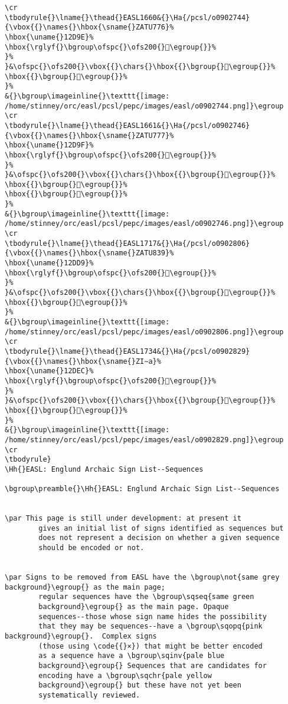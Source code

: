 \begin{verbatim}
\cr
\tbodyrule{}\lname{}\thead{}EASL1660&{}\Ha{/pcsl/o0902744}{\vbox{{}\names{}\hbox{\sname{}ZATU776}%
\hbox{\uname{}12D9E}%
\hbox{\rglyf{}\bgroup\ofspc{}\ofs200{}𒶞\egroup{}}%
}%
}&\ofspc{}\ofs200{}\vbox{{}\chars{}\hbox{{}\bgroup{}𒶞\egroup{}}%
\hbox{{}\bgroup{}𒶝\egroup{}}%
}%
&{}\bgroup\imageinline{}\texttt{[image: /home/stinney/orc/easl/pcsl/pepc/images/easl/o0902744.png]}\egroup
\cr
\tbodyrule{}\lname{}\thead{}EASL1661&{}\Ha{/pcsl/o0902746}{\vbox{{}\names{}\hbox{\sname{}ZATU777}%
\hbox{\uname{}12D9F}%
\hbox{\rglyf{}\bgroup\ofspc{}\ofs200{}𒶟\egroup{}}%
}%
}&\ofspc{}\ofs200{}\vbox{{}\chars{}\hbox{{}\bgroup{}𒶟\egroup{}}%
\hbox{{}\bgroup{}𒶠\egroup{}}%
\hbox{{}\bgroup{}𒶡\egroup{}}%
}%
&{}\bgroup\imageinline{}\texttt{[image: /home/stinney/orc/easl/pcsl/pepc/images/easl/o0902746.png]}\egroup
\cr
\tbodyrule{}\lname{}\thead{}EASL1717&{}\Ha{/pcsl/o0902806}{\vbox{{}\names{}\hbox{\sname{}ZATU839}%
\hbox{\uname{}12DD9}%
\hbox{\rglyf{}\bgroup\ofspc{}\ofs200{}𒷙\egroup{}}%
}%
}&\ofspc{}\ofs200{}\vbox{{}\chars{}\hbox{{}\bgroup{}𒷙\egroup{}}%
\hbox{{}\bgroup{}𒷚\egroup{}}%
}%
&{}\bgroup\imageinline{}\texttt{[image: /home/stinney/orc/easl/pcsl/pepc/images/easl/o0902806.png]}\egroup
\cr
\tbodyrule{}\lname{}\thead{}EASL1734&{}\Ha{/pcsl/o0902829}{\vbox{{}\names{}\hbox{\sname{}ZI∼a}%
\hbox{\uname{}12DEC}%
\hbox{\rglyf{}\bgroup\ofspc{}\ofs200{}𒷬\egroup{}}%
}%
}&\ofspc{}\ofs200{}\vbox{{}\chars{}\hbox{{}\bgroup{}𒷫\egroup{}}%
\hbox{{}\bgroup{}𒷬\egroup{}}%
}%
&{}\bgroup\imageinline{}\texttt{[image: /home/stinney/orc/easl/pcsl/pepc/images/easl/o0902829.png]}\egroup
\cr
\tbodyrule}
\Hh{}EASL: Englund Archaic Sign List--Sequences

\bgroup\preamble{}\Hh{}EASL: Englund Archaic Sign List--Sequences


\par This page is still under development: at present it
	    gives an initial list of signs identified as sequences but
	    does not represent a decision on whether a given sequence
	    should be encoded or not.


\par Signs to be removed from EASL have the \bgroup\not{same grey background}\egroup{} as the main page;
	    regular sequences have the \bgroup\sqseq{same green
	    background}\egroup{} as the main page. Opaque
	    sequences--those whose sign name hides the possibility
	    that they may be sequences--have a \bgroup\sqopq{pink background}\egroup{}.  Complex signs
	    (those using \code{{}×}) that might be better encoded
	    as a sequence have a \bgroup\sqinv{pale blue
	    background}\egroup{} Sequences that are candidates for
	    encoding have a \bgroup\sqchr{pale yellow
	    background}\egroup{} but these have not yet been
	    systematically reviewed.


\end{verbatim}
